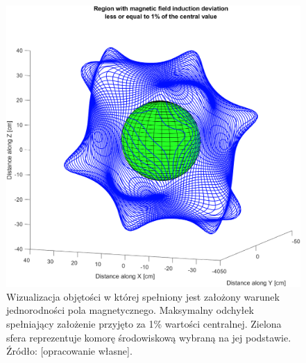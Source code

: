                                 
  \begin{figure}[t]
         	\centering
         	\includegraphics[scale=0.22]{pole_mag}
         	\caption{Wizualizacja objętości w której spełniony jest założony warunek jednorodności pola magnetycznego. Maksymalny odchyłek spełniający założenie przyjęto za 1\% wartości centralnej. Zielona sfera reprezentuje komorę środowiskową wybraną na jej podstawie. Źródło: [opracowanie własne].} 
         	\label{fig:polemag}
  \end{figure}
  

